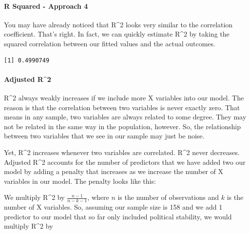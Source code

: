 \documentclass[]{article}
\newenvironment{Shaded}{\begin{snugshade}}{\end{snugshade}}
\newcommand{\KeywordTok}[1]{\textcolor[rgb]{0.13,0.29,0.53}{\textbf{#1}}}
\newcommand{\DecValTok}[1]{\textcolor[rgb]{0.00,0.00,0.81}{#1}}
\newcommand{\StringTok}[1]{\textcolor[rgb]{0.31,0.60,0.02}{#1}}
\newcommand{\OperatorTok}[1]{\textcolor[rgb]{0.81,0.36,0.00}{\textbf{#1}}}
\newcommand{\NormalTok}[1]{#1}
\let\oldparagraph\paragraph
\renewcommand{\paragraph}[1]{\oldparagraph{#1}\mbox{}}
\theoremstyle{definition}
\theoremstyle{definition}
\theoremstyle{definition}
\theoremstyle{remark}
\begin{document}
\paragraph{R Squared - Approach 4}\label{r-squared---approach-4}

You may have already noticed that R\^{}2 looks very similar to the
correlation coefficient. That's right. In fact, we can quickly estimate
R\^{}2 by taking the squared correlation between our fitted values and
the actual outcomes.

\begin{Shaded}
\end{Shaded}

\begin{verbatim}
[1] 0.4990749
\end{verbatim}

\paragraph{Adjusted R\^{}2}\label{adjusted-r2}

R\^{}2 always weakly increases if we include more X variables into our
model. The reason is that the correlation between two variables is never
exactly zero. That means in any sample, two variables are always related
to some degree. They may not be related in the same way in the
population, however. So, the relationship between two variables that we
see in our sample may just be noise.

Yet, R\^{}2 increases whenever two variables are correlated. R\^{}2
never decreases. Adjusted R\^{}2 accounts for the number of predictors
that we have added two our model by adding a penalty that increases as
we increase the number of X variables in our model. The penalty looks
like this:

We multiply R\^{}2 by \(\frac{n-1}{n-k-1}\), where \(n\) is the number
of observations and \(k\) is the number of X variables. So, assuming our
sample size is 158 and we add 1 predictor to our model that so far only
included political stability, we would multiply R\^{}2 by
\end{document}
